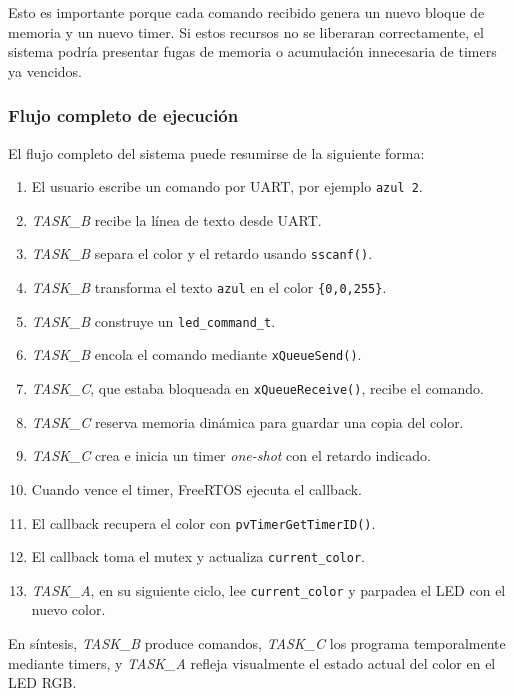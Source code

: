 \documentclass[12pt,letterpaper]{article}
\begin{document}
Esto es importante porque cada comando recibido genera un nuevo bloque de memoria y un nuevo timer. Si estos recursos no se liberaran correctamente, el sistema podría presentar fugas de memoria o acumulación innecesaria de timers ya vencidos.

\subsubsection{Flujo completo de ejecución}

El flujo completo del sistema puede resumirse de la siguiente forma:

\begin{enumerate}
    \item El usuario escribe un comando por UART, por ejemplo \texttt{azul 2}.
    \item \textit{TASK\_B} recibe la línea de texto desde UART.
    \item \textit{TASK\_B} separa el color y el retardo usando \texttt{sscanf()}.
    \item \textit{TASK\_B} transforma el texto \texttt{azul} en el color \texttt{\{0,0,255\}}.
    \item \textit{TASK\_B} construye un \texttt{led\_command\_t}.
    \item \textit{TASK\_B} encola el comando mediante \texttt{xQueueSend()}.
    \item \textit{TASK\_C}, que estaba bloqueada en \texttt{xQueueReceive()}, recibe el comando.
    \item \textit{TASK\_C} reserva memoria dinámica para guardar una copia del color.
    \item \textit{TASK\_C} crea e inicia un timer \textit{one-shot} con el retardo indicado.
    \item Cuando vence el timer, FreeRTOS ejecuta el callback.
    \item El callback recupera el color con \texttt{pvTimerGetTimerID()}.
    \item El callback toma el mutex y actualiza \texttt{current\_color}.
    \item \textit{TASK\_A}, en su siguiente ciclo, lee \texttt{current\_color} y parpadea el LED con el nuevo color.
\end{enumerate}

En síntesis, \textit{TASK\_B} produce comandos, \textit{TASK\_C} los programa temporalmente mediante timers, y \textit{TASK\_A} refleja visualmente el estado actual del color en el LED RGB.
\end{document}
